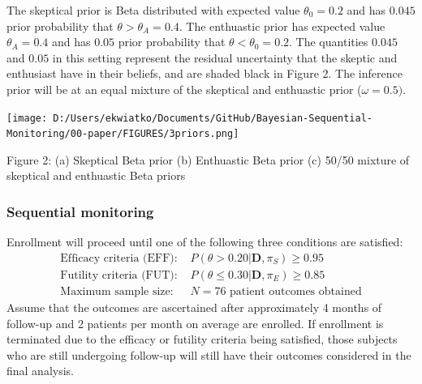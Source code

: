 \documentclass[12pt]{article}
\begin{document}
The skeptical prior is Beta distributed with expected value $\theta_0=0.2$ and has $0.045$ prior probability that $\theta>\theta_A=0.4$. The enthuastic prior has expected value $\theta_A=0.4$ and has $0.05$ prior probability that $\theta<\theta_0=0.2$. The quantities $0.045$ and $0.05$ in this setting represent the residual uncertainty that the skeptic and enthusiast have in their beliefs, and are shaded black in Figure 2. The inference prior will be at an equal mixture of the skeptical and enthuastic prior ($\omega=0.5)$.



\begin{center}
\texttt{[image: D:/Users/ekwiatko/Documents/GitHub/Bayesian-Sequential-Monitoring/00-paper/FIGURES/3priors.png]}

Figure 2: (a) Skeptical Beta prior (b) Enthuastic Beta prior (c) 50/50 mixture of skeptical and enthuastic Beta priors
\end{center}




\newpage
\subsubsection{Sequential monitoring}
Enrollment will proceed until one of the following three conditions are satisfied:
\begin{align*}
\text{Efficacy criteria (EFF): }&P(\theta>0.20|\mathbf{D},\pi_S)\geq 0.95\\
\text{Futility criteria (FUT): }&P(\theta\leq 0.30|\mathbf{D},\pi_E)\geq 0.85\\
\text{Maximum sample size: }&N=76 \text{ patient outcomes obtained}
\end{align*}
Assume that the outcomes are ascertained after approximately 4 months of follow-up and 2 patients per month on average are enrolled. If enrollment is terminated due to the efficacy or futility criteria being satisfied, those subjects who are still undergoing follow-up will still have their outcomes considered in the final analysis.
\end{document}
